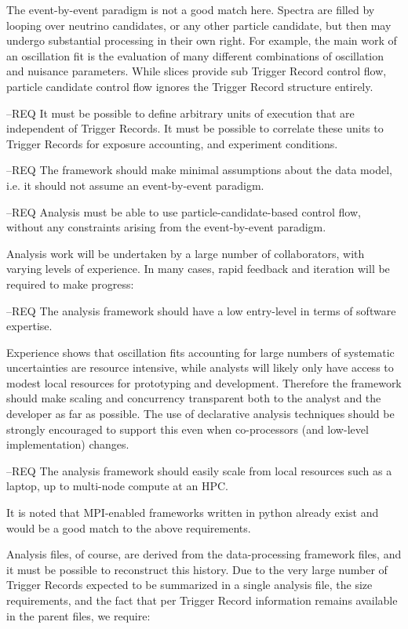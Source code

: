 \documentclass[../main-v1.tex]{subfiles}
\begin{document}
The event-by-event paradigm is not a good match here. Spectra are filled by looping over neutrino candidates, or any other particle candidate, but then may undergo substantial processing in their own right. For example, the main work of an oscillation fit is the evaluation of many different combinations of oscillation and nuisance parameters.  While slices provide sub Trigger Record control flow, particle candidate control flow ignores the Trigger Record structure entirely.

--REQ It must be possible to define arbitrary units of execution that are independent of Trigger Records.  It must be possible to correlate these units to Trigger Records for exposure accounting, and experiment conditions.


--REQ The framework should make minimal assumptions about the data model, i.e. it should not assume an event-by-event paradigm.

--REQ Analysis must be able to use particle-candidate-based control flow, without any constraints arising from the event-by-event paradigm.


Analysis work will be undertaken by a large number of collaborators, with varying levels of experience. In many cases, rapid feedback and iteration will be required to make progress:

--REQ The analysis framework should have a low entry-level in terms of software expertise.

Experience shows that oscillation fits accounting for large numbers of systematic uncertainties are resource intensive, while analysts will likely only have access to modest local resources for prototyping and development.  Therefore the framework should make scaling and concurrency transparent both to the analyst and the developer as far as possible.  The use of declarative analysis techniques should be strongly encouraged to support this even when co-processors (and low-level implementation) changes.

--REQ The analysis framework should easily scale from local resources such as a laptop, up to multi-node compute at an HPC.

It is noted that MPI-enabled frameworks written in python already exist and would be a good match to the above requirements.

Analysis files, of course, are derived from the data-processing framework files, and it must be possible to reconstruct this history. Due to the very large number of Trigger Records expected to be summarized in a single analysis file, the size requirements, and the fact that per Trigger Record information remains available in the parent files, we require:
\end{document}
